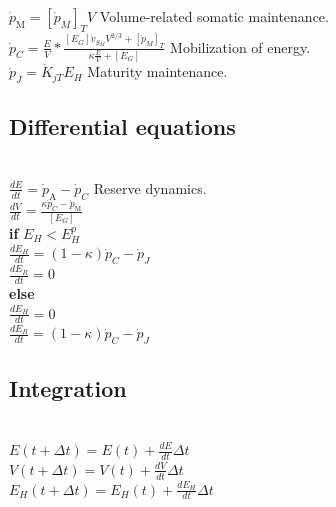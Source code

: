 $\dot{p}_\mathrm{M} = \left [ \dot{p}_{M} \right ]_{T} V$ \hfill Volume-related somatic maintenance.\\

$\dot{p}_{C} = \frac{E}{V}*\frac{\left [ E_{G} \right ]\dot{v}_{S_{M}}V^{2/3}+\left [ \dot{p}_{M} \right ]_{T}}{\kappa\frac{E}{V}+\left [ E_{G} \right ]}$ \hfill Mobilization of energy.\\

$\dot{p}_{J} = \dot{K}_{jT} E_{H}$ \hfill Maturity maintenance.\\

\subsection*{Differential equations}
\hfill \\

$\frac{dE}{dt} = \dot{p}_\mathrm{A} - \dot{p}_{C}$ \hfill Reserve dynamics.\\

$\frac{dV}{dt} = \frac{\kappa \dot{p}_{C} - \dot{p}_\mathrm{M}}{\left[E_{G} \right]}$\\

\textbf{if} $E_{H} < E_{H}^p$\\

$\frac{dE_{H}}{dt} = (1 - \kappa) \dot{p}_{C} - \dot{p}_{J}$\\

$\frac{dE_{R}}{dt} = 0$\\

\textbf{else}\\

$\frac{dE_{H}}{dt} = 0$\\

$\frac{dE_{R}}{dt} = (1 - \kappa) \dot{p}_{C} - \dot{p}_{J}$\\

\subsection*{Integration}
\hfill \\

$E\left ( t + \Delta t \right ) = E\left ( t \right ) + \frac{dE}{dt}\Delta t$ \\

$V\left ( t + \Delta t \right ) = V\left ( t \right ) + \frac{dV}{dt}\Delta t$ \\

$E_{H}\left ( t + \Delta t \right ) = E_{H}\left ( t \right ) + \frac{dE_{H}}{dt}\Delta t$ \\

